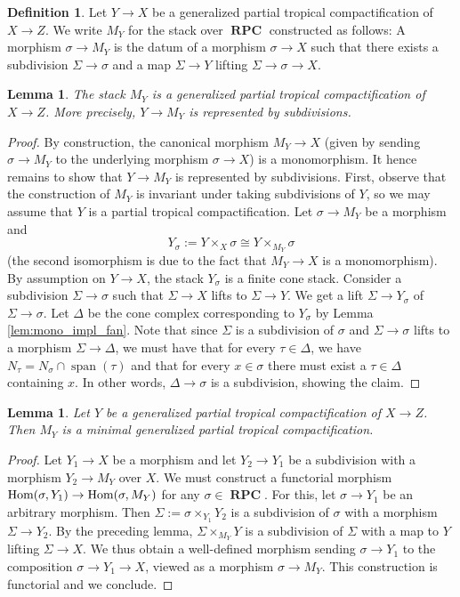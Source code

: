\documentclass[11pt]{amsart}
\newtheorem{lemma}[theorem]{Lemma}
\theoremstyle{definition}
\newtheorem{definition}[theorem]{Definition}
\theoremstyle{remark}
\DeclareMathOperator{\Span}{span}
\DeclareMathOperator{\RPC}{\mathbf{RPC}}
\DeclareMathOperator{\Hom}{\textup{Hom}}
\begin{document}
\begin{definition}
	Let $Y\to X$ be a generalized partial tropical compactification of $X\to Z$. We write $M_Y$ for the stack over $\RPC$
	constructed as follows: A morphism $\sigma\to M_Y$ is the datum of a morphism $\sigma\to X$ such that
	there exists a subdivision $\Sigma\to \sigma$ and a map $\Sigma\to Y$ lifting $\Sigma\to \sigma\to X$.
\end{definition}

\begin{lemma}
	The stack $M_Y$ is a generalized partial tropical compactification of $X\to Z$. More precisely, $Y\to M_Y$ is represented
	by subdivisions.
\end{lemma}

\begin{proof}
	By construction, the canonical morphism $M_Y\to X$ (given by sending $\sigma\to M_Y$ to the underlying
	morphism $\sigma\to X$) is a monomorphism. It hence remains to show that $Y\to M_Y$ is represented by
	subdivisions. First, observe that the construction of $M_Y$ is invariant under taking subdivisions of
	$Y$, so we may assume that $Y$ is a partial tropical compactification.
	Let $\sigma\to M_Y$ be a morphism and
	$$Y_{\sigma}:=Y\times_{X}\sigma\cong Y\times_{M_Y}\sigma$$
	(the second isomorphism is due to the fact that $M_Y\to X$ is a monomorphism). By assumption on $Y\to X$, the stack $Y_{\sigma}$
	is a finite cone stack. Consider a subdivision $\Sigma\to \sigma$ such that $\Sigma\to X$ lifts to $\Sigma\to Y$.
	We get a lift $\Sigma\to Y_{\sigma}$ of $\Sigma\to \sigma$. Let $\Delta$ be the cone complex corresponding to
	$Y_{\sigma}$ by Lemma \ref{lem:mono_impl_fan}. Note that since $\Sigma$ is a subdivision of $\sigma$ and $\Sigma\to \sigma$ lifts
	to a morphism $\Sigma\to \Delta$, we must have that for every $\tau\in \Delta$, we have $N_{\tau}=N_{\sigma}\cap \Span(\tau)$
	and that for every $x\in \sigma$ there must exist a $\tau\in \Delta$ containing $x$. In other words, $\Delta\to \sigma$ is
	a subdivision, showing the claim.
\end{proof}

\begin{lemma}
	Let $Y$ be a generalized partial tropical compactification of $X\to Z$. Then $M_Y$ is a minimal generalized partial tropical compactification.
\end{lemma}

\begin{proof}
	Let $Y_1\to X$ be a morphism and let $Y_2\to Y_1$ be a subdivision
	with a morphism $Y_2\to M_Y$ over $X$.
	We must construct a functorial morphism $\Hom(\sigma,Y_1)\to \Hom(\sigma,M_Y)$
	for any $\sigma\in \RPC$. For this, let $\sigma\to Y_1$ be an arbitrary morphism. Then $\Sigma:=\sigma\times_{Y_1}Y_2$
	is a subdivision of $\sigma$ with a morphism $\Sigma\to Y_2$. By the preceding lemma, $\Sigma\times_{M_Y}Y$
	is a subdivision of $\Sigma$ with a map to $Y$ lifting $\Sigma\to X$. We thus obtain a well-defined morphism sending
	$\sigma\to Y_1$ to the composition $\sigma\to Y_1\to X$, viewed
	as a morphism $\sigma\to M_Y$. This construction is functorial and we conclude.
\end{proof}
\end{document}
